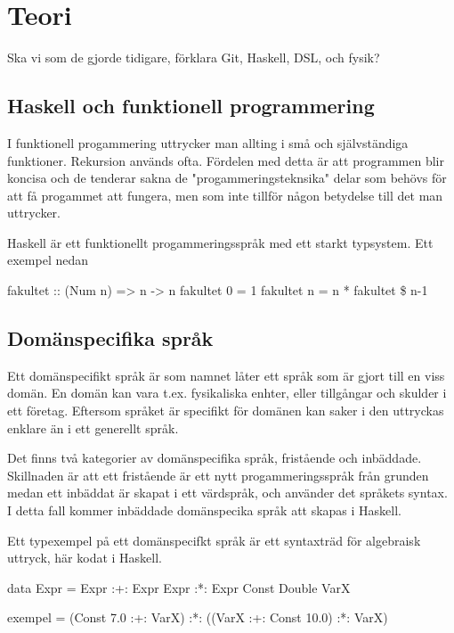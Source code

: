
\chapter{Teori}

\begin{binge}
Ska vi som de gjorde tidigare, förklara Git, Haskell, DSL, och fysik?

\section{Haskell och funktionell programmering}

I funktionell progammering uttrycker man allting i små och självständiga funktioner. Rekursion används ofta. Fördelen med detta är att programmen blir koncisa och de tenderar sakna de "progammeringsteknsika" delar som behövs för att få progammet att fungera, men som inte tillför någon betydelse till det man uttrycker.

Haskell är ett funktionellt progammeringsspråk med ett starkt typsystem. Ett exempel nedan

    fakultet :: (Num n) => n -> n
    fakultet 0 = 1
    fakultet n = n * fakultet \$ n-1

\section{Domänspecifika språk}

Ett domänspecifikt språk är som namnet låter ett språk som är gjort till en viss domän. En domän kan vara t.ex. fysikaliska enhter, eller tillgångar och skulder i ett företag. Eftersom språket är specifikt för domänen kan saker i den uttryckas enklare än i ett generellt språk.

Det finns två kategorier av domänspecifika språk, fristående och inbäddade. Skillnaden är att ett fristående är ett nytt progammeringsspråk från grunden medan ett inbäddat är skapat i ett värdspråk, och använder det språkets syntax. I detta fall kommer inbäddade domänspecika språk att skapas i Haskell.

Ett typexempel på ett domänspecifkt språk är ett syntaxträd för algebraisk uttryck, här kodat i Haskell.

    data Expr = Expr :+: Expr
                Expr :*: Expr
                Const Double
                VarX

    exempel = (Const 7.0 :+: VarX) :*: ((VarX :+: Const 10.0) :*: VarX)


\end{binge}
